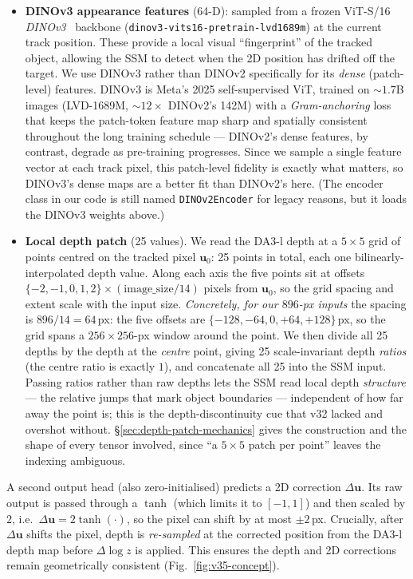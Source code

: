 \documentclass[11pt,a4paper]{article}
\begin{document}
\begin{itemize}
\item \textbf{DINOv3 appearance features} (64-D): sampled from a frozen ViT-S/16
  \emph{DINOv3}~\cite{dinov3} backbone (\texttt{dinov3-vits16-pretrain-lvd1689m}) at the current
  track position. These provide a local visual ``fingerprint'' of the tracked object, allowing the
  SSM to detect when the 2D position has drifted off the target.
  We use DINOv3 rather than DINOv2 specifically for its \emph{dense} (patch-level) features. DINOv3
  is Meta's 2025 self-supervised ViT, trained on ${\sim}1.7$B images (LVD-1689M, ${\sim}12\times$
  DINOv2's 142M) with a \emph{Gram-anchoring} loss that keeps the patch-token feature map sharp and
  spatially consistent throughout the long training schedule --- DINOv2's dense features, by
  contrast, degrade as pre-training progresses. Since we sample a single feature vector at each
  track pixel, this patch-level fidelity is exactly what matters, so DINOv3's dense maps are a
  better fit than DINOv2's here. (The encoder class in our code is still named \texttt{DINOv2Encoder}
  for legacy reasons, but it loads the DINOv3 weights above.)
\item \textbf{Local depth patch} (25 values). We read the DA3-l depth at a $5{\times}5$ grid of points
  centred on the tracked pixel $\mathbf{u}_0$: 25 points in total, each one bilinearly-interpolated
  depth value. Along each axis the five points sit at offsets
  $\{-2,-1,0,1,2\}\times(\text{image\_size}/14)$ pixels from $\mathbf{u}_0$, so the grid spacing and
  extent scale with the input size. \emph{Concretely, for our $896$-px inputs} the spacing is
  $896/14 = 64$\,px: the five offsets are $\{-128,-64,0,+64,+128\}$\,px, so the grid spans a
  $256{\times}256$-px window around the point. We then divide all 25 depths by the depth at the
  \emph{centre} point, giving 25 scale-invariant depth \emph{ratios} (the centre ratio is exactly
  $1$), and concatenate all 25 into the SSM input. Passing ratios rather than raw depths lets the SSM
  read local depth \emph{structure} --- the relative jumps that mark object boundaries --- independent
  of how far away the point is; this is the depth-discontinuity cue that v32 lacked and overshot
  without. \S\ref{sec:depth-patch-mechanics} gives the construction and the shape of every tensor
  involved, since ``a $5{\times}5$ patch per point'' leaves the indexing ambiguous.
\end{itemize}

A second output head (also zero-initialised) predicts a 2D correction $\Delta\mathbf{u}$. Its raw
output is passed through a $\tanh$ (which limits it to $[-1,1]$) and then scaled by $2$, i.e.\
$\Delta\mathbf{u} = 2\tanh(\cdot)$, so the pixel can shift by at most $\pm 2$\,px.
Crucially, after $\Delta\mathbf{u}$ shifts the pixel,
depth is \emph{re-sampled} at the corrected position from the DA3-l depth map before
$\Delta\!\log z$ is applied.  This ensures the depth and 2D corrections remain geometrically
consistent (Fig.~\ref{fig:v35-concept}).
\end{document}
